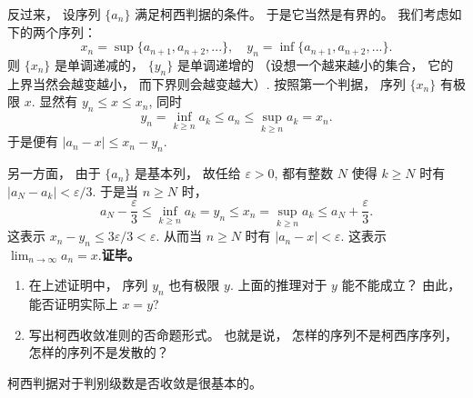 反过来， 设序列 $\{a_n\}$ 满足柯西判据的条件。 于是它当然是有界的。 我们考虑如下的两个序列：
$$
x_n=\sup\{a_{n+1},a_{n+2},...\},
\quad
y_n=\inf\{a_{n+1},a_{n+2},...\}.
$$
则 $\{x_n\}$ 是单调递减的， $\{y_n\}$ 是单调递增的 （设想一个越来越小的集合， 它的上界当然会越变越小， 而下界则会越变越大）. 按照第一个判据， 序列 $\{x_n\}$ 有极限 $x$. 显然有 $y_n\leq x\leq x_n$, 同时
$$
y_n=\inf_{k\geq n}a_k\leq a_n\leq \sup_{k\geq n}a_k=x_n.
$$
于是便有 $|a_n-x|\leq x_n-y_n$. 

另一方面， 由于 $\{a_n\}$ 是基本列， 故任给 $\varepsilon>0$, 都有整数 $N$ 使得 $k\geq N$ 时有 $|a_N-a_k|<\varepsilon/3$. 于是当 $n\geq N$ 时，
$$
a_N-\frac{\varepsilon}{3}\leq \inf_{k\geq n}a_k=y_n
\leq x_n=\sup_{k\geq n}a_k\leq a_N+\frac{\varepsilon}{3}.
$$
这表示 $x_n-y_n\leq 3\varepsilon/3<\varepsilon$. 从而当 $n\geq N$ 时有 $|a_n-x|<\varepsilon$. 这表示 $\lim_{n\to\infty}a_n=x$.\textbf{证毕。}

\begin{exercise}{}
\begin{enumerate}
\item 在上述证明中， 序列 $y_n$ 也有极限 $y$. 上面的推理对于 $y$ 能不能成立？ 由此， 能否证明实际上 $x=y$?
\item 写出柯西收敛准则的否命题形式。 也就是说， 怎样的序列不是柯西序序列， 怎样的序列不是发散的？
\end{enumerate}
\end{exercise}

柯西判据对于判别级数是否收敛是很基本的。
